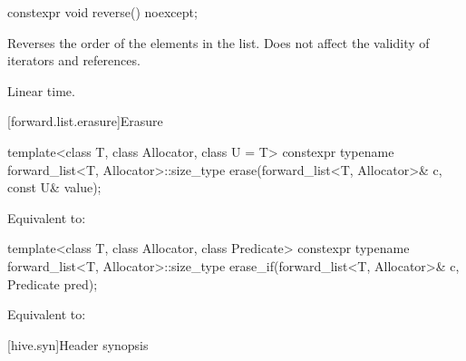 %
\begin{itemdecl}
constexpr void reverse() noexcept;
\end{itemdecl}

\begin{itemdescr}
\pnum
\effects
Reverses the order of the elements in the list.
Does not affect the validity of iterators and references.

\pnum
\complexity
Linear time.
\end{itemdescr}

[forward.list.erasure]{Erasure}

%
\begin{itemdecl}
template<class T, class Allocator, class U = T>
  constexpr typename forward_list<T, Allocator>::size_type
    erase(forward_list<T, Allocator>& c, const U& value);
\end{itemdecl}

\begin{itemdescr}
\pnum
\effects
Equivalent to: 
\end{itemdescr}

%
\begin{itemdecl}
template<class T, class Allocator, class Predicate>
  constexpr typename forward_list<T, Allocator>::size_type
    erase_if(forward_list<T, Allocator>& c, Predicate pred);
\end{itemdecl}

\begin{itemdescr}
\pnum
\effects
Equivalent to: 
\end{itemdescr}

[hive.syn]{Header  synopsis}


